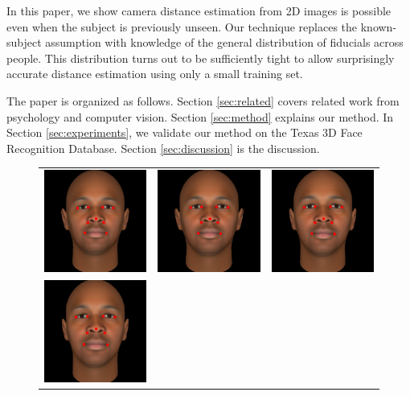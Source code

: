 \documentclass[runningheads]{llncs}
\begin{document}
In this paper, we show camera distance estimation from 2D images is possible even when the subject is previously unseen.
Our technique replaces the known-subject assumption with knowledge of the general distribution of fiducials across people.
This distribution turns out to be sufficiently tight to allow surprisingly accurate distance estimation using only a small training set.

The paper is organized as follows.
Section \ref{sec:related} covers related work from psychology and computer vision.
Section \ref{sec:method} explains our method.
In Section \ref{sec:experiments}, we validate our method on the Texas 3D Face Recognition Database.
Section \ref{sec:discussion} is the discussion.

\begin{figure}[ht!]
\centering
\begin{tabular}{ccc}
\includegraphics[width=.33\linewidth]{resources/figures/extracted_fiducial_0006.png} &
\includegraphics[width=.33\linewidth]{resources/figures/extracted_fiducial_0008.png} &
\includegraphics[width=.33\linewidth]{resources/figures/extracted_fiducial_0001.png} \\
\includegraphics[width=.33\linewidth]{resources/figures/extracted_fiducial_0002.png} &

\end{tabular}
\end{figure}
\end{document}
